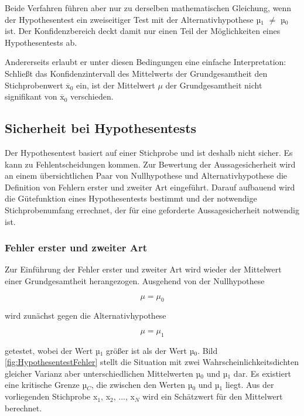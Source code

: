 \noindent Beide Verfahren f\"{u}hren aber nur zu derselben mathematischen Gleichung, wenn der Hypothesentest ein zweiseitiger Test mit der Alternativhypothese µ$_{1}$ $\neq$ µ$_{0}$ ist. Der Konfidenzbereich deckt damit nur einen Teil der M\"{o}glichkeiten eines Hypothesentests ab.\newline

\noindent Andererseits erlaubt er unter diesen Bedingungen eine einfache Interpretation: Schlie{\ss}t das Konfidenzintervall des Mittelwerts der Grundgesamtheit den Stichprobenwert ${\overline{\mathrm{x}}}_0$ ein, ist der Mittelwert $\mu$ der Grundgesamtheit nicht signifikant von ${\overline{\mathrm{x}}}_0$ verschieden.

\clearpage

\subsection{Sicherheit bei Hypothesentests}

\noindent Der Hypothesentest basiert auf einer Stichprobe und ist deshalb nicht sicher. Es kann zu Fehlentscheidungen kommen. Zur Bewertung der Aussagesicherheit wird an einem \"{u}bersichtlichen Paar von Nullhypothese und Alternativhypothese die Definition von Fehlern erster und zweiter Art eingef\"{u}hrt. Darauf aufbauend wird die G\"{u}tefunktion eines Hypothesentests bestimmt und der notwendige Stichprobenumfang errechnet, der f\"{u}r eine geforderte Aussagesicherheit notwendig ist.

\subsubsection{Fehler erster und zweiter Art}

\noindent Zur Einf\"{u}hrung der Fehler erster und zweiter Art wird wieder der Mittelwert einer Grundgesamtheit herangezogen. Ausgehend von der Nullhypothese 

\begin{equation}\label{eq:sixfiftyfour}
\mu =\mu _{0}
\end{equation}

\noindent wird zun\"{a}chst gegen die Alternativhypothese

\begin{equation}\label{eq:sixfiftyfive}
\mu =\mu _{1}
\end{equation}

getestet, wobei der Wert µ$_{1}$ gr\"{o}{\ss}er ist als der Wert µ$_{0}$. Bild \ref{fig:HypothesentestFehler} stellt die Situation mit zwei Wahrscheinlichkeitsdichten gleicher Varianz aber unterschiedlichen Mittelwerten µ$_{0}$ und µ$_{1}$ dar. Es existiert eine kritische Grenze µ$_{C}$, die zwischen den Werten µ$_{0}$ und µ$_{1}$ liegt. Aus der vorliegenden Stichprobe x$_{1}$, x$_{2}$, ..., x$_{N}$ wird ein Sch\"{a}tzwert f\"{u}r den Mittelwert berechnet.

